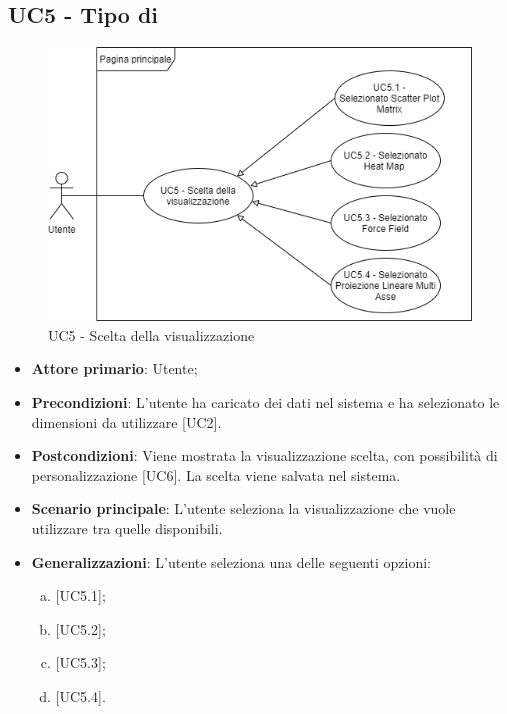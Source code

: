 \subsection{UC5 - Tipo di }
\begin{figure}[!htb]
\includegraphics[width=\linewidth]{Section/Images/UC5.png}
\centering
\caption{UC5 - Scelta della visualizzazione}
\end{figure}

\begin{itemize}
	\item \textbf{Attore primario}: Utente;
	\item \textbf{Precondizioni}: L'utente ha caricato dei dati nel sistema e ha selezionato le dimensioni da utilizzare [UC2].
	\item \textbf{Postcondizioni}: Viene mostrata la visualizzazione scelta, con possibilità di personalizzazione [UC6]. La scelta viene salvata nel sistema.
	\item \textbf{Scenario principale}: L'utente seleziona la visualizzazione che vuole utilizzare tra quelle disponibili.
	\item \textbf{Generalizzazioni}: L'utente seleziona una delle seguenti opzioni:
		\begin{enumerate}[(a)]
			\item {} [UC5.1];
			\item {} [UC5.2];
			\item {} [UC5.3];
			\item {} [UC5.4].
		\end{enumerate}

\end{itemize}
